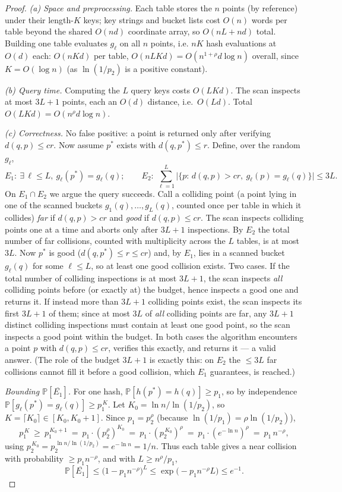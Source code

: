 \documentclass{amsart}
\renewcommand{\Pr}{\mathbb{P}}
\begin{document}
\begin{proof}
\emph{(a) Space and preprocessing.}  Each table stores the $n$ points (by reference)
under their length-$K$ keys; key strings and bucket lists cost $O(n)$ words per table
beyond the shared $O(nd)$ coordinate array, so $O(nL+nd)$ total.  Building one table
evaluates $g_\ell$ on all $n$ points, i.e. $nK$ hash evaluations at $O(d)$ each:
$O(nKd)$ per table, $O(nLKd)=O(n^{1+\rho}d\log n)$ overall, since $K=O(\log n)$ (as
$\ln(1/p_2)$ is a positive constant).

\emph{(b) Query time.}  Computing the $L$ query keys costs $O(LKd)$.  The scan
inspects at most $3L+1$ points, each an $O(d)$ distance, i.e.\ $O(Ld)$.  Total
$O(LKd)=O(n^{\rho}d\log n)$.

\emph{(c) Correctness.}  No false positive: a point is returned only after verifying
$d(q,p)\le cr$.  Now assume $p^\ast$ exists with $d(q,p^\ast)\le r$.  Define, over the
random $g_\ell$,
\[
E_1:\ \exists\,\ell\le L,\ g_\ell(p^\ast)=g_\ell(q);
\qquad
E_2:\ \sum_{\ell=1}^L \big|\{p:\,d(q,p)>cr,\ g_\ell(p)=g_\ell(q)\}\big|\le 3L .
\]
On $E_1\cap E_2$ we argue the query succeeds.  Call a colliding point (a point
lying in one of the scanned buckets $g_1(q),\dots,g_L(q)$, counted once per table in
which it collides) \emph{far} if $d(q,p)>cr$ and \emph{good} if $d(q,p)\le cr$.  The
scan inspects colliding points one at a time and aborts only after $3L+1$ inspections.
By $E_2$ the total number of far collisions, counted with multiplicity across the $L$
tables, is at most $3L$.  Now $p^\ast$ is good ($d(q,p^\ast)\le r\le cr$) and, by
$E_1$, lies in a scanned bucket $g_\ell(q)$ for some $\ell\le L$, so at least one good
collision exists.  Two cases.  If the total number of colliding inspections is at most
$3L+1$, the scan inspects \emph{all} colliding points before (or exactly at) the
budget, hence inspects a good one and returns it.  If instead more than $3L+1$
colliding points exist, the scan inspects its first $3L+1$ of them; since at most $3L$
of \emph{all} colliding points are far, any $3L+1$ distinct colliding inspections must
contain at least one good point, so the scan inspects a good point within the budget.
In both cases the algorithm encounters a point $p$ with $d(q,p)\le cr$, verifies this
exactly, and returns it --- a valid answer.  (The role of the budget $3L+1$ is exactly
this: on $E_2$ the $\le 3L$ far collisions cannot fill it before a good collision,
which $E_1$ guarantees, is reached.)

\emph{Bounding $\Pr[\overline{E_1}]$.}  For one hash, $\Pr[h(p^\ast)=h(q)]\ge p_1$, so
by independence $\Pr[g_\ell(p^\ast)=g_\ell(q)]\ge p_1^{\,K}$.  Let
$K_0=\ln n/\ln(1/p_2)$, so $K=\lceil K_0\rceil\in[K_0,K_0+1]$.  Since $p_1=p_2^{\rho}$
(because $\ln(1/p_1)=\rho\ln(1/p_2)$),
\[
p_1^{\,K}\ \ge\ p_1^{\,K_0+1}\ =\ p_1\cdot (p_2^{\rho})^{K_0}\ =\ p_1\cdot (p_2^{\,K_0})^{\rho}
\ =\ p_1\cdot (e^{-\ln n})^{\rho}\ =\ p_1\,n^{-\rho},
\]
using $p_2^{\,K_0}=p_2^{\,\ln n/\ln(1/p_2)}=e^{-\ln n}=1/n$.  Thus each table gives a
near collision with probability $\ge p_1 n^{-\rho}$, and with $L\ge n^{\rho}/p_1$,
\[
\Pr[\overline{E_1}]\le \big(1-p_1 n^{-\rho}\big)^{L}
\le \exp\!\big(-p_1 n^{-\rho} L\big)\le e^{-1}.
\]


\end{proof}
\end{document}

